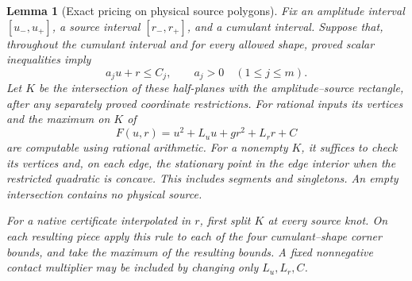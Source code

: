 \documentclass[11pt]{article}
\newtheorem{lemma}[theorem]{Lemma}
\begin{document}
\begin{lemma}[Exact pricing on physical source polygons]
\label{lem:physical-source-polygon-price}
Fix an amplitude interval $[u_-,u_+]$, a source interval $[r_-,r_+]$,
and a cumulant interval. Suppose that, throughout the cumulant interval
and for every allowed shape, proved scalar inequalities imply
\[
 a_j u+r\le C_j,\qquad a_j>0\quad(1\le j\le m).
\]
Let $K$ be the intersection of these half-planes with the amplitude--source
rectangle, after any separately proved coordinate restrictions.
For rational inputs its vertices and the maximum on $K$ of
\[
 F(u,r)=u^2+L_u u+g r^2+L_r r+C
\]
are computable using rational arithmetic. For a nonempty $K$, it suffices
to check its vertices and, on each edge, the stationary point in the edge
interior when the restricted quadratic is concave. This includes segments
and singletons. An empty intersection contains no physical source.

For a native certificate interpolated in $r$, first split $K$ at every
source knot. On each resulting piece apply this rule to each of the four
cumulant--shape corner bounds, and take the maximum of the resulting
bounds. A fixed nonnegative contact multiplier may be included by changing
only $L_u,L_r,C$.
\end{lemma}
\end{document}
